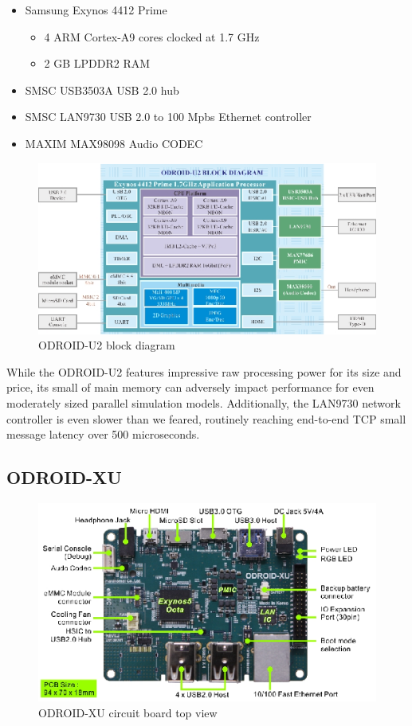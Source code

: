 \documentclass[11pt]{book}
\begin{document}
\begin{itemize}
\item Samsung Exynos 4412 Prime
  \begin{itemize}
  \item 4 ARM Cortex-A9 cores clocked at 1.7 GHz
  \item 2 GB LPDDR2 RAM
  \end{itemize}
\item SMSC USB3503A USB 2.0 hub
\item SMSC LAN9730 USB 2.0 to 100 Mpbs Ethernet controller
\item MAXIM MAX98098 Audio CODEC
\end{itemize}

\begin{figure}[h]
\centering
\includegraphics[width=\textwidth]{odroid_u2_block_diagram}
\caption{ODROID-U2 block diagram \cite{odroid-u2-board-detail}}
\label{odroid-u2-block-diagram}
\end{figure}

While the ODROID-U2 features impressive raw processing power for its size and
price, its small of main memory can adversely impact performance for even
moderately sized parallel simulation models. Additionally, the LAN9730 network
controller is even slower than we feared, routinely reaching end-to-end TCP
small message latency over 500 microseconds.


\subsection{\textbf{ODROID-XU}}

\begin{figure}[h]
\includegraphics[width=\textwidth]{odroid_xu_top}
\caption{ODROID-XU circuit board top view \cite{odroid-xu-board-detail}}
\label{odroid-xu-board}
\end{figure}
\end{document}

